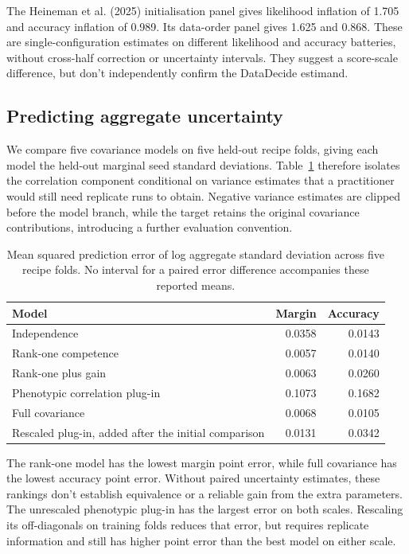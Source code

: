 \documentclass{article}
\begin{document}
The Heineman et al. (2025) initialisation panel gives likelihood inflation of 1.705 and accuracy inflation of 0.989. Its data-order panel gives 1.625 and 0.868. These are single-configuration estimates on different likelihood and accuracy batteries, without cross-half correction or uncertainty intervals. They suggest a score-scale difference, but don't independently confirm the DataDecide estimand.

\subsection{Predicting aggregate uncertainty}
We compare five covariance models on five held-out recipe folds, giving each model the held-out marginal seed standard deviations. Table~\ref{tab:prediction} therefore isolates the correlation component conditional on variance estimates that a practitioner would still need replicate runs to obtain. Negative variance estimates are clipped before the model branch, while the target retains the original covariance contributions, introducing a further evaluation convention.

\begin{table}[t]
\centering
\caption{Mean squared prediction error of log aggregate standard deviation across five recipe folds. No interval for a paired error difference accompanies these reported means.}
\label{tab:prediction}
\begin{tabular}{lrr}
\toprule
Model & Margin & Accuracy\\
\midrule
Independence & 0.0358 & 0.0143\\
Rank-one competence & 0.0057 & 0.0140\\
Rank-one plus gain & 0.0063 & 0.0260\\
Phenotypic correlation plug-in & 0.1073 & 0.1682\\
Full covariance & 0.0068 & 0.0105\\
Rescaled plug-in, added after the initial comparison & 0.0131 & 0.0342\\
\bottomrule
\end{tabular}
\end{table}

The rank-one model has the lowest margin point error, while full covariance has the lowest accuracy point error. Without paired uncertainty estimates, these rankings don't establish equivalence or a reliable gain from the extra parameters. The unrescaled phenotypic plug-in has the largest error on both scales. Rescaling its off-diagonals on training folds reduces that error, but requires replicate information and still has higher point error than the best model on either scale.
\end{document}
